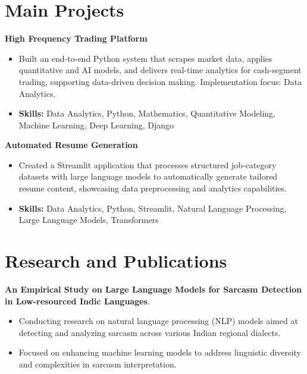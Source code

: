 \documentclass[a4paper,11pt]{article}
\begin{document}
\section{\textbf{Main Projects}}

\vspace{1mm}
  \textbf{High Frequency Trading Platform  }
\vspace{-1.5mm} %
\begin{itemize}
  \item Built an end-to-end Python system that scrapes market data, applies quantitative and AI models, and delivers real-time analytics for cash-segment trading, supporting data-driven decision making. Implementation focus: Data Analytics.
\vspace{-3mm}
  \item \textbf{Skills:} Data Analytics, Python, Mathematics, Quantitative Modeling, Machine Learning, Deep Learning, Django
\end{itemize}


\vspace{1mm}
   \textbf{Automated Resume Generation }
\vspace{-1.5mm} %
\begin{itemize}
  \item Created a Streamlit application that processes structured job-category datasets with large language models to automatically generate tailored resume content, showcasing data preprocessing and analytics capabilities.
\vspace{-3mm}
  \item \textbf{Skills:} Data Analytics, Python, Streamlit, Natural Language Processing, Large Language Models, Transformers
\end{itemize}



\section{\textbf{Research and Publications} \hfill }
\vspace{1mm}
  \textbf{An Empirical Study on Large Language Models for Sarcasm Detection in Low-resourced Indic Languages}.
\vspace{-1mm} %
\begin{itemize}
  \item Conducting research on natural language processing (NLP) models aimed at detecting and analyzing sarcasm across various Indian regional dialects.
\vspace{-3mm}
  \item Focused on enhancing machine learning models to address linguistic diversity and complexities in sarcasm interpretation.
\end{itemize}
\end{document}
